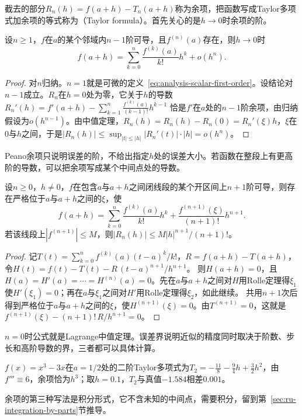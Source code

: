 截去的部分$R_n(h)=f(a+h)-T_n(a+h)$称为余项，把函数写成Taylor多项式加余项的等式称为（Taylor formula）。首先关心的是$h\to0$时余项的阶。
\begin{theorem}[带Peano余项的Taylor公式]
\label{thm:ru-taylor-peano}
设$n\geq1$，$f$在$a$的某个邻域内$n-1$阶可导，且$f^{(n)}(a)$存在，则$h\to0$时
\[
 f(a+h)=\sum_{k=0}^n\frac{f^{(k)}(a)}{k!}h^k+o(h^n).
\]
\end{theorem}
\begin{proof}
对$n$归纳。$n=1$就是可微的定义~\eqref{eq:analysis-scalar-first-order}。设结论对$n-1$成立。$R_n$在$h=0$处为零，它关于$h$的导数$R_n'(h)=f'(a+h)-\sum_{k=1}^n\frac{f^{(k)}(a)}{(k-1)!}h^{k-1}$
恰是$f'$在$a$处的$n-1$阶余项，由归纳假设为$o(h^{n-1})$。由中值定理，$R_n(h)=R_n(h)-R_n(0)=R_n'(\xi)h$，$\xi$在$0$与$h$之间，于是$|R_n(h)|\leq\sup_{|t|\leq|h|}|R_n'(t)|\cdot|h|=o(h^n)$。
\end{proof}
Peano余项只说明误差的阶，不给出指定$h$处的误差大小。若函数在整段上有更高阶的导数，可以把余项写成某个中间点处的导数。
\begin{theorem}[带Lagrange余项的Taylor公式]
\label{thm:analysis-taylor-lagrange}
设$n\geq0$，$h\neq0$，$f$在包含$a$与$a+h$之间闭线段的某个开区间上$n+1$阶可导，则存在严格位于$a$与$a+h$之间的$\xi$，使
\begin{equation}
 f(a+h)=\sum_{k=0}^n\frac{f^{(k)}(a)}{k!}h^k+\frac{f^{(n+1)}(\xi)}{(n+1)!}h^{n+1}.
 \label{eq:analysis-taylor-arbitrary-order}
\end{equation}
若该线段上$|f^{(n+1)}|\leq M$，则$|R_n(h)|\leq M|h|^{n+1}/(n+1)!$。
\end{theorem}
\begin{proof}
记$T(t)=\sum_{k=0}^nf^{(k)}(a)(t-a)^k/k!$，$R=f(a+h)-T(a+h)$，令$H(t)=f(t)-T(t)-R\,(t-a)^{n+1}/h^{n+1}$。
则$H(a+h)=0$，且$H(a)=H'(a)=\cdots=H^{(n)}(a)=0$。先在$a$与$a+h$之间对$H$用Rolle定理得$\xi_1$使$H'(\xi_1)=0$；再在$a$与$\xi_1$之间对$H'$用Rolle定理得$\xi_2$，如此继续。
共用$n+1$次后得到严格位于$a$与$a+h$之间的$\xi$，使$H^{(n+1)}(\xi)=0$。由$T^{(n+1)}=0$，这就是$f^{(n+1)}(\xi)-(n+1)!\,R/h^{n+1}=0$。
\end{proof}
$n=0$时公式就是Lagrange中值定理。误差界说明近似的精度同时取决于阶数、步长和高阶导数的界，三者都可以具体计算。

\begin{example}[三次多项式的二阶Taylor近似]
\label{ex:ru-cubic-taylor-remainder}
$f(x)=x^3-3x$在$a=1/2$处的二阶Taylor多项式为$T_2=-\tfrac{11}8-\tfrac94h+\tfrac32h^2$，由$f'''\equiv6$，余项恰为$h^3$；取$h=0.1$，$T_2$与真值$-1.584$相差$0.001$。
\end{example}
余项的第三种写法是积分形式，它不含未知的中间点，需要积分，留到第~\ref{sec:ru-integration-by-parts}节推导。

